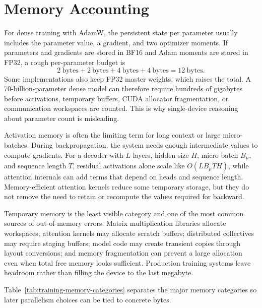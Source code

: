\section{Memory Accounting}
\label{sec:training-memory-accounting}

For dense training with AdamW, the persistent state per parameter usually includes the parameter value, a gradient, and two optimizer moments. If parameters and gradients are stored in BF16 and Adam moments are stored in FP32, a rough per-parameter budget is
\begin{equation}
  2\ \mathrm{bytes}
  + 2\ \mathrm{bytes}
  + 4\ \mathrm{bytes}
  + 4\ \mathrm{bytes}
  =
  12\ \mathrm{bytes}.
\end{equation}
Some implementations also keep FP32 master weights, which raises the total. A 70-billion-parameter dense model can therefore require hundreds of gigabytes before activations, temporary buffers, CUDA allocator fragmentation, or communication workspaces are counted. This is why single-device reasoning about parameter count is misleading.

Activation memory is often the limiting term for long context or large micro-batches. During backpropagation, the system needs enough intermediate values to compute gradients. For a decoder with $L$ layers, hidden size $H$, micro-batch $B_{\mu}$, and sequence length $T$, residual activations alone scale like $O(LB_{\mu}TH)$, while attention internals can add terms that depend on heads and sequence length. Memory-efficient attention kernels reduce some temporary storage, but they do not remove the need to retain or recompute the values required for backward.

Temporary memory is the least visible category and one of the most common sources of out-of-memory errors. Matrix multiplication libraries allocate workspaces; attention kernels may allocate scratch buffers; distributed collectives may require staging buffers; model code may create transient copies through layout conversions; and memory fragmentation can prevent a large allocation even when total free memory looks sufficient. Production training systems leave headroom rather than filling the device to the last megabyte.

Table~\ref{tab:training-memory-categories} separates the major memory categories so later parallelism choices can be tied to concrete bytes.

